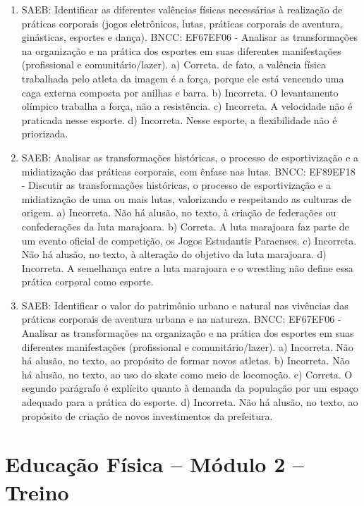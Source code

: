 \begin{enumerate}
\item
SAEB: Identificar as diferentes valências físicas necessárias à
realização de práticas corporais (jogos eletrônicos, lutas, práticas
corporais de aventura, ginásticas, esportes e dança).
BNCC: EF67EF06 - Analisar as transformações na organização e na prática
dos esportes em suas diferentes manifestações (profissional e
comunitário/lazer).
a) Correta. de fato, a valência física trabalhada pelo atleta da imagem 
é a força, porque ele está vencendo uma caga externa composta por anilhas
e barra.
b) Incorreta. O levantamento olímpico trabalha a força, não a
resistência.
c) Incorreta. A velocidade não é praticada nesse esporte.
d) Incorreta. Nesse esporte, a flexibilidade não é priorizada.

\item
SAEB: Analisar as transformações históricas, o processo de
esportivização e a midiatização das práticas corporais, com ênfase nas
lutas.
BNCC: EF89EF18 - Discutir as transformações históricas, o processo de
esportivização e a midiatização de uma ou mais lutas, valorizando e
respeitando as culturas de origem.
a) Incorreta. Não há alusão, no texto, à criação de
federações ou confederações da luta marajoara. 
b) Correta. A luta marajoara faz parte de um evento oficial de
competição, os Jogos Estudantis Paraenses.
c) Incorreta. Não há alusão, no texto, à alteração do objetivo da luta
marajoara. 
d) Incorreta. A semelhança entre a luta marajoara e o
wrestling não define essa prática corporal como esporte.

\item
SAEB: Identificar o valor do patrimônio urbano e natural
nas vivências das práticas corporais de aventura urbana e na natureza.
BNCC: EF67EF06 - Analisar as transformações na organização e na prática
dos esportes em suas diferentes manifestações (profissional e
comunitário/lazer).
a) Incorreta. Não há alusão, no texto, ao propósito de formar novos
atletas.
b) Incorreta. Não há alusão, no texto, ao uso do skate como meio
de locomoção. 
c) Correta. O segundo parágrafo é explícito quanto à demanda da 
população por um espaço adequado para a prática do esporte.
d) Incorreta. Não há alusão, no texto, ao propósito de criação de novos investimentos da prefeitura.
\end{enumerate}

\section*{Educação Física – Módulo 2 –  Treino}


